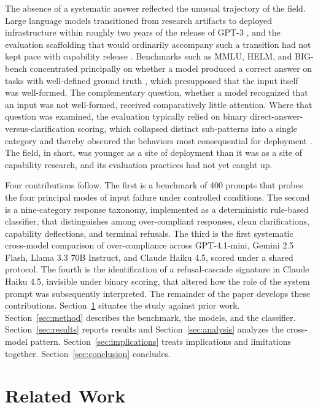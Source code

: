 \documentclass[10pt]{article}
\begin{document}
The absence of a systematic answer reflected the unusual trajectory of the field. Large language models transitioned from research artifacts to deployed infrastructure within roughly two years of the release of GPT-3 \citep{brown2020language}, and the evaluation scaffolding that would ordinarily accompany such a transition had not kept pace with capability release \citep{bommasani2021opportunities,bubeck2023sparks}. Benchmarks such as MMLU, HELM, and BIG-bench concentrated principally on whether a model produced a correct answer on tasks with well-defined ground truth \citep{hendrycks2021measuring,liang2023holistic,srivastava2023beyond}, which presupposed that the input itself was well-formed. The complementary question, whether a model recognized that an input was not well-formed, received comparatively little attention. Where that question was examined, the evaluation typically relied on binary direct-answer-versus-clarification scoring, which collapsed distinct sub-patterns into a single category and thereby obscured the behaviors most consequential for deployment \citep{zhang2025clam,wu2025clarifycoder}. The field, in short, was younger as a site of deployment than it was as a site of capability research, and its evaluation practices had not yet caught up.

Four contributions follow. The first is a benchmark of 400 prompts that probes the four principal modes of input failure under controlled conditions. The second is a nine-category response taxonomy, implemented as a deterministic rule-based classifier, that distinguishes among over-compliant responses, clean clarifications, capability deflections, and terminal refusals. The third is the first systematic cross-model comparison of over-compliance across GPT-4.1-mini, Gemini 2.5 Flash, Llama 3.3 70B Instruct, and Claude Haiku 4.5, scored under a shared protocol. The fourth is the identification of a refusal-cascade signature in Claude Haiku 4.5, invisible under binary scoring, that altered how the role of the system prompt was subsequently interpreted. The remainder of the paper develops these contributions. Section~\ref{sec:related} situates the study against prior work. Section~\ref{sec:method} describes the benchmark, the models, and the classifier. Section~\ref{sec:results} reports results and Section~\ref{sec:analysis} analyzes the cross-model pattern. Section~\ref{sec:implications} treats implications and limitations together. Section~\ref{sec:conclusion} concludes.

\section{Related Work}
\label{sec:related}
\end{document}
